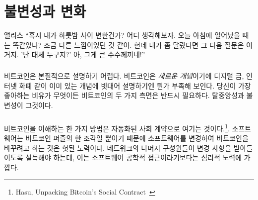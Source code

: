 \chapter{불변성과 변화}
\label{les:1}

\begin{chapquote}{앨리스}
	\enquote{혹시 내가 하룻밤 사이 변한건가? 어디 생각해보자.
		오늘 아침에 일어났을 때는 똑같았나? 조금 다른 느낌이었던 것 같아. 
		헌데 내가 좀 달랐다면 그 다음 질문은 이거지. '난 대체 누구지?' 아, 그게 큰 수수께끼네!}
\end{chapquote}

\paragraph{}
비트코인은 본질적으로 설명하기 어렵다. 
비트코인은 \textit{새로운 개념}이기에 디지털 금, 인터넷 화폐 같이 이미 있는 개념에 빗대어 설명하기엔 뭔가 부족해 보인다. 
당신이 가장 좋아하는 비유가 무엇이든 비트코인의 두 가지 측면은 반드시 필요하다. 탈중앙성과 불변성이 그것이다.

\paragraph{}
비트코인을 이해하는 한 가지 방법은 자동화된 사회 계약으로 여기는 것이다.\footnote{Hasu, Unpacking Bitcoin's Social Contract~\cite{social-contract}}. 
소프트웨어는 비트코인 퍼즐의 한 조각일 뿐이기 때문에
소프트웨어를 변경하여 비트코인을 바꾸려고 하는 것은 헛된 노력이다.
네트워크의 나머지 구성원들이 변경 사항을 받아들이도록 설득해야 하는데, 
이는 소프트웨어 공학적 접근이라기보다는 심리적 노력에 가깝다.

